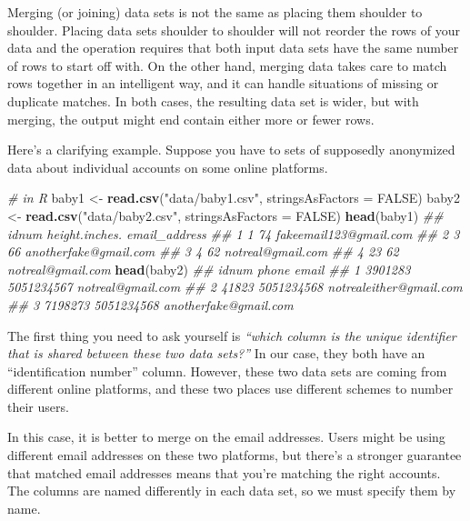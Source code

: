 \documentclass[12pt,krantz2]{krantz}
\makeatletter
\newenvironment{Shaded}{\begin{snugshade}}{\end{snugshade}}
\newcommand{\CommentTok}[1]{\textcolor[rgb]{0.37,0.37,0.37}{\textit{#1}}}
\newcommand{\DataTypeTok}[1]{\textcolor[rgb]{0.27,0.27,0.27}{#1}}
\newcommand{\KeywordTok}[1]{\textcolor[rgb]{0.27,0.27,0.27}{\textbf{#1}}}
\newcommand{\NormalTok}[1]{#1}
\newcommand{\OtherTok}[1]{\textcolor[rgb]{0.37,0.37,0.37}{#1}}
\newcommand{\StringTok}[1]{\textcolor[rgb]{0.5,0.5,0.5}{#1}}
\newenvironment{kframe}{%
\medskip{}
\setlength{\fboxsep}{.8em}
 \def\at@end@of@kframe{}%
 \ifinner\ifhmode%
  \def\at@end@of@kframe{\end{minipage}}%
  \begin{minipage}{\columnwidth}%
 \fi\fi%
 \def\FrameCommand##1{\hskip\@totalleftmargin \hskip-\fboxsep
 \colorbox{shadecolor}{##1}\hskip-\fboxsep
     \hskip-\linewidth \hskip-\@totalleftmargin \hskip\columnwidth}%
 \MakeFramed {\advance\hsize-\width
   \@totalleftmargin\z@ \linewidth\hsize
   \@setminipage}}%
 {\par\unskip\endMakeFramed%
 \at@end@of@kframe}
\renewenvironment{Shaded}{\begin{kframe}}{\end{kframe}}
\makeatother
\begin{document}
Merging (or joining) data sets is not the same as placing them shoulder to shoulder. Placing data sets shoulder to shoulder will not reorder the rows of your data and the operation requires that both input data sets have the same number of rows to start off with. On the other hand, merging data takes care to match rows together in an intelligent way, and it can handle situations of missing or duplicate matches. In both cases, the resulting data set is wider, but with merging, the output might end contain either more or fewer rows.

Here's a clarifying example. Suppose you have to sets of supposedly anonymized data about individual accounts on some online platforms.

\begin{Shaded}
\begin{Highlighting}[]
\CommentTok{# in R}
\NormalTok{baby1 <-}\StringTok{ }\KeywordTok{read.csv}\NormalTok{(}\StringTok{"data/baby1.csv"}\NormalTok{, }\DataTypeTok{stringsAsFactors =} \OtherTok{FALSE}\NormalTok{)}
\NormalTok{baby2 <-}\StringTok{ }\KeywordTok{read.csv}\NormalTok{(}\StringTok{"data/baby2.csv"}\NormalTok{, }\DataTypeTok{stringsAsFactors =} \OtherTok{FALSE}\NormalTok{)}
\KeywordTok{head}\NormalTok{(baby1)}
\CommentTok{##   idnum height.inches.          email_address}
\CommentTok{## 1     1             74 fakeemail123@gmail.com}
\CommentTok{## 2     3             66  anotherfake@gmail.com}
\CommentTok{## 3     4             62      notreal@gmail.com}
\CommentTok{## 4    23             62      notreal@gmail.com}
\KeywordTok{head}\NormalTok{(baby2)}
\CommentTok{##     idnum      phone                   email}
\CommentTok{## 1 3901283 5051234567       notreal@gmail.com}
\CommentTok{## 2   41823 5051234568 notrealeither@gmail.com}
\CommentTok{## 3 7198273 5051234568   anotherfake@gmail.com}
\end{Highlighting}
\end{Shaded}

The first thing you need to ask yourself is \emph{``which column is the unique identifier that is shared between these two data sets?''} In our case, they both have an ``identification number'' column. However, these two data sets are coming from different online platforms, and these two places use different schemes to number their users.

In this case, it is better to merge on the email addresses. Users might be using different email addresses on these two platforms, but there's a stronger guarantee that matched email addresses means that you're matching the right accounts. The columns are named differently in each data set, so we must specify them by name.
\end{document}
